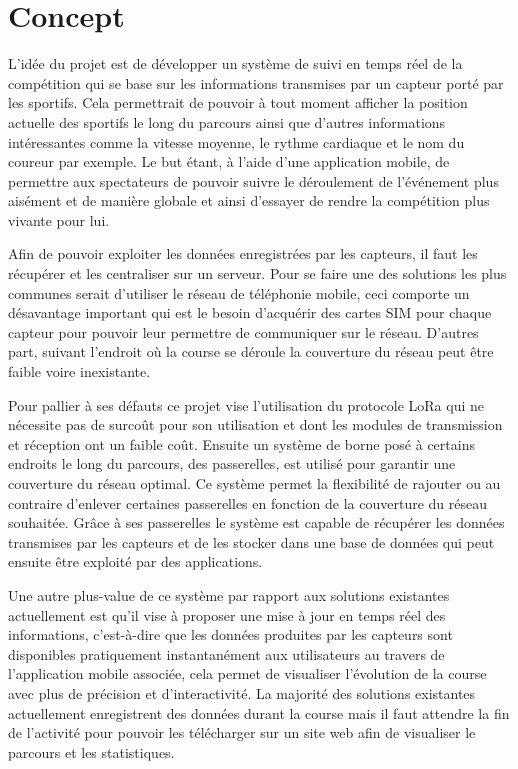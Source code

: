 \chapter{Concept}

L’idée du projet est de développer un système de suivi en temps réel de la compétition qui se base sur les informations transmises par un capteur porté par les sportifs. Cela permettrait de pouvoir à tout moment afficher la position actuelle des sportifs le long du parcours ainsi que d’autres informations intéressantes comme la vitesse moyenne, le rythme cardiaque et le nom du coureur par exemple. Le but étant, à l’aide d’une application mobile, de permettre aux spectateurs de pouvoir suivre le déroulement de l’événement plus aisément et de manière globale et ainsi d’essayer de rendre la compétition plus vivante pour lui.

Afin de pouvoir exploiter les données enregistrées par les capteurs, il faut les récupérer et les centraliser sur un serveur. Pour se faire une des solutions les plus communes serait d’utiliser le réseau de téléphonie mobile, ceci comporte un désavantage important qui est le besoin d’acquérir des cartes SIM pour chaque capteur pour pouvoir leur permettre de communiquer sur le réseau. D’autres part, suivant l’endroit où la course se déroule la couverture du réseau peut être faible voire inexistante. 

Pour pallier à ses défauts ce projet vise l’utilisation du protocole LoRa qui ne nécessite pas de surcoût pour son utilisation et dont les modules de transmission et réception ont un faible coût. Ensuite un système de borne posé à certains endroits le long du parcours, des passerelles, est utilisé pour garantir une couverture du réseau optimal. Ce système permet la flexibilité de rajouter ou au contraire d’enlever certaines passerelles en fonction de la couverture du réseau souhaitée. Grâce à ses passerelles le système est capable de récupérer les données transmises par les capteurs et de les stocker dans une base de données qui peut ensuite être exploité par des applications.

Une autre plus-value de ce système par rapport aux solutions existantes actuellement est qu’il vise à proposer une mise à jour en temps réel des informations, c’est-à-dire que les données produites par les capteurs sont disponibles pratiquement instantanément aux utilisateurs au travers de l’application mobile associée, cela permet de visualiser l’évolution de la course avec plus de précision et d’interactivité. La majorité des solutions existantes actuellement enregistrent des données durant la course mais il faut attendre la fin de l’activité pour pouvoir les télécharger sur un site web afin de visualiser le parcours et les statistiques.
